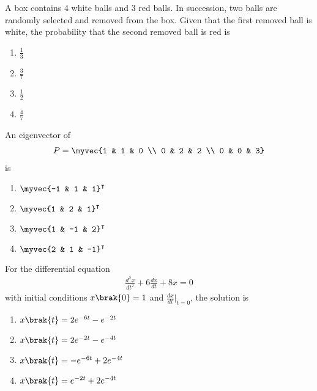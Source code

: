 \iffalse
\chapter{2010}
\author{AI24BTECH11009}
\section{ee}
\fi

\item A box contains 4 white balls and 3 red balls. In succession, two balls are randomly selected and removed from the box. Given that the first removed ball is white, the probability that the second removed ball is red is
    \begin{enumerate}
        \item $\frac{1}{3}$
        \item $\frac{3}{7}$
        \item $\frac{1}{2}$
        \item $\frac{4}{7}$ \\
    \end{enumerate}
\item An eigenvector of 
\begin{align*}
    P = \myvec{1 & 1 & 0 \\ 0 & 2 & 2 \\ 0 & 0 & 3}
\end{align*}
is
\begin{enumerate}
    \item $\myvec{-1 & 1 & 1}^\intercal$
    \item $\myvec{1 & 2 & 1}^\intercal$
    \item $\myvec{1 & -1 & 2}^\intercal$
    \item $\myvec{2 & 1 & -1}^\intercal$ \\
\end{enumerate}
\item For the differential equation 
\begin{align*}
    \frac{d^2x}{dt^2} + 6\frac{dx}{dt} + 8x = 0
\end{align*}
with initial conditions $x\brak{0}=1$ and $\frac{dx}{dt}\bigg|_{t=0}$, the solution is
\begin{enumerate}
    \item $x\brak{t} = 2e^{-6t} - e^{-2t}$
    \item $x\brak{t} = 2e^{-2t} - e^{-4t}$
    \item $x\brak{t} = -e^{-6t} + 2e^{-4t}$
    \item $x\brak{t} = e^{-2t} + 2e^{-4t}$ \\
\end{enumerate}

